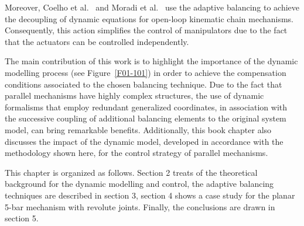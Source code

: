 Moreover, Coelho et al.~\cite{15coelho} and Moradi et al.~\cite{16moradi} use the adaptive balancing to achieve the 
decoupling of dynamic equations for open-loop kinematic chain mechanisms. 
Consequently, this action simplifies the control of manipulators due to the fact that the 
actuators can be controlled independently. 

The main contribution of this work is to highlight the importance of the dynamic modelling 
process (see Figure~\ref{F01-101}) in order to achieve the compensation conditions associated to the chosen 
balancing technique. Due to the fact that parallel mechanisms have highly complex structures,
the use of dynamic formalisms that employ redundant generalized coordinates,
in association with the successive coupling of additional balancing elements 
to the original system model, can bring remarkable benefits.
Additionally, this book chapter also discusses the impact of
the dynamic model, developed in accordance with the methodology shown here, for the 
control strategy of parallel mechanisms.

This chapter is organized as follows. Section 2 treats of the theoretical background for the dynamic modelling and control, the adaptive balancing techniques are described in section 3, section 4 shows a case study for the planar 5-bar mechanism with revolute joints.  Finally, the conclusions are drawn in section 5.


